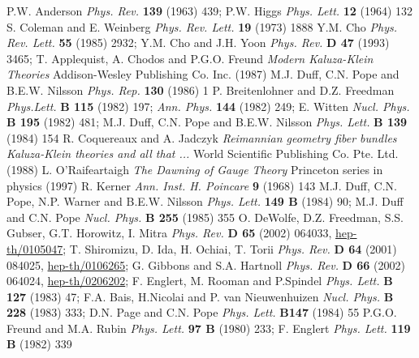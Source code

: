 \documentclass[a4paper,12pt]{article}
\def\hhref#1{\href{http://arxiv.org/abs/hep-th/#1}{hep-th/#1}}
\begin{document}
\begin{thebibliography}{99}

 P.W. Anderson {\it Phys. Rev.} {\bf 139} (1963) 439; P.W. Higgs {\it Phys. Lett.} {\bf 12} (1964) 132
 S. Coleman and E. Weinberg {\it Phys. Rev. Lett.} {\bf 19} (1973) 1888
 Y.M. Cho {\it Phys. Rev. Lett.} {\bf 55} (1985) 2932; Y.M. Cho and J.H. Yoon {\it Phys. Rev. } {\bf D 47} (1993) 3465; 
 T. Applequist, A. Chodos and P.G.O. Freund {\it Modern Kaluza-Klein Theories} Addison-Wesley Publishing Co. Inc. (1987)
 M.J. Duff, C.N. Pope and B.E.W. Nilsson {\it Phys. Rep.} {\bf 130} (1986) 1
 P. Breitenlohner and D.Z. Freedman {\it Phys.Lett.} {\bf B 115 } (1982) 197; {\it Ann. Phys.} {\bf 144} (1982) 249; E. Witten {\it Nucl. Phys.} {\bf B 195} (1982) 481; M.J. Duff, C.N. Pope and B.E.W. Nilsson {\it Phys. Lett.} {\bf B 139} (1984) 154
 R. Coquereaux and A. Jadczyk {\it Reimannian geometry fiber bundles Kaluza-Klein theories and all that ...} World Scientific Publishing Co. Pte. Ltd. (1988)
 L. O'Raifeartaigh {\it The Dawning of Gauge Theory} Princeton series in physics (1997)
 R. Kerner {\it Ann. Inst. H. Poincare} {\bf 9} (1968) 143  
  M.J. Duff, C.N. Pope, N.P. Warner and B.E.W. Nilsson {\it Phys. Lett.} {\bf 149 B} (1984) 90;  M.J. Duff and  C.N. Pope {\it Nucl. Phys.} {\bf B 255} (1985) 355
  O. DeWolfe, D.Z. Freedman, S.S. Gubser, G.T. Horowitz, I. Mitra {\it Phys. Rev.} {\bf D 65} (2002) 064033, \hhref{0105047};  T. Shiromizu, D. Ida, H. Ochiai, T. Torii {\it Phys. Rev.} {\bf D 64} (2001) 084025, \hhref{0106265}; G. Gibbons and S.A. Hartnoll  {\it Phys. Rev.} {\bf D 66} (2002) 064024, \hhref{0206202}; 
 F. Englert, M. Rooman and P.Spindel {\it Phys. Lett.} {\bf B 127} (1983) 47; F.A. Bais, H.Nicolai and P. van Nieuwenhuizen {\it Nucl. Phys.} {\bf B 228} (1983) 333; D.N. Page and C.N. Pope {\it Phys. Lett.} {\bf B147} (1984) 55 
  P.G.O. Freund and M.A. Rubin {\it Phys. Lett.} {\bf 97 B} (1980) 233;  F. Englert {\it Phys. Lett.} {\bf 119 B} (1982) 339

\end{thebibliography}
\end{document}
